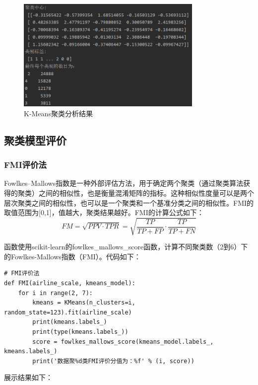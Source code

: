\documentclass[UTF8,12pt]{article}
\begin{document}
\begin{figure}[htbp]
    \centering
    \includegraphics[width=0.8\textwidth]{img/10.png}
    \caption{K-Means聚类分析结果}
\end{figure}

\subsection{聚类模型评价}
\subsubsection{FMI评价法}
Fowlkes–Mallows指数是一种外部评估方法，用于确定两个聚类（通过聚类算法获得的聚类）之间的相似性，也是衡量混淆矩阵的指标。这种相似性度量可以是两个层次聚类之间的相似性，也可以是一个聚类和一个基准分类之间的相似性。FMI的取值范围为[0,1]，值越大，聚类结果越好。FMI的计算公式如下：
$$FM=\sqrt{PPV \cdot TPR}=\sqrt{\frac{TP}{TP+FP} \cdot \frac{TP}{TP+FN}}$$

函数使用scikit-learn的fowlkes\_mallows\_score函数，计算不同聚类数（2到6）下的Fowlkes-Mallows指数（FMI）。代码如下：

\begin{lstlisting}[title=FMI评价法,frame=shadowbox]
# FMI评价法
def FMI(airline_scale, kmeans_model):
    for i in range(2, 7):
        kmeans = KMeans(n_clusters=i, random_state=123).fit(airline_scale)
        print(kmeans.labels_)
        print(type(kmeans.labels_))
        score = fowlkes_mallows_score(kmeans_model.labels_, kmeans.labels_)
        print('数据聚%d类FMI评价分值为：%f' % (i, score))
\end{lstlisting}

展示结果如下：
\end{document}
